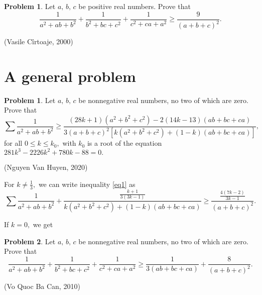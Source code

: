 \documentclass[12pt,a4paper]{book}
\theoremstyle{definition}
\newtheorem{pro}{\cmss\problemColor Problem}
\newtheorem*{mypro}{\cmss\problemColor Problem}
\begin{document}

\begin{mypro}
Let $a,\,b,\,c$ be positive real numbers. Prove that
\[\frac{1}{a^2+a b+b^2}+\frac{1}{b^2+b c+c^2}+\frac{1}{c^2+c a+a^2} \geqslant \frac{9}{(a+b+c)^2}.\]
\vspace{-1.0cm}
\begin{flushright}(Vasile Cîrtoaje, 2000)\end{flushright}
\end{mypro}

\section{A general problem}

\begin{pro}
Let $a,\,b,\,c$ be nonnegative real numbers, no two of which are zero. Prove that
\begin{equation}\label{eq1}
\sum \frac{1}{a^2+ab+b^2} \geq  \frac{(28k+1)(a^2+b^2+c^2)-2(14k-13)(ab+bc+ca)}{3(a+b+c)^2\left[k(a^2+b^2+c^2)+(1-k)(ab+bc+ca)\right]},
\end{equation}
for all $0 \leqslant k \leqslant k_0,$ with $k_0$  is a root of the equation $281k^3-2226k^2+780k-88 = 0.$
\begin{flushright}
(Nguyen Van Huyen, 2020)
\end{flushright}
\end{pro} 

For $k \ne \frac13,$ we can write inequality \eqref{eq1} as
\[\sum \frac{1}{a^2+ab+b^2}+ \frac{\frac{k+1}{3(3k-1)}}{k(a^2+b^2+c^2)+(1-k)(ab+bc+ca)} \geqslant \frac{\frac{4(7k-2)}{3k-1}}{(a+b+c)^2}.\]


If $k = 0,$ we get
\begin{pro}
Let $a,\,b,\,c$ be nonnegative real numbers, no two of which are zero. Prove that
\[\frac{1}{a^2+ab+b^2}+\frac{1}{b^2+bc+c^2}+\frac{1}{c^2+ca+a^2} \ge \frac{1}{3(ab+bc+ca)}+\frac{8}{(a+b+c)^2}.\]
\begin{flushright}
(Vo Quoc Ba Can, 2010)
\end{flushright}
\end{pro}
\end{document}
